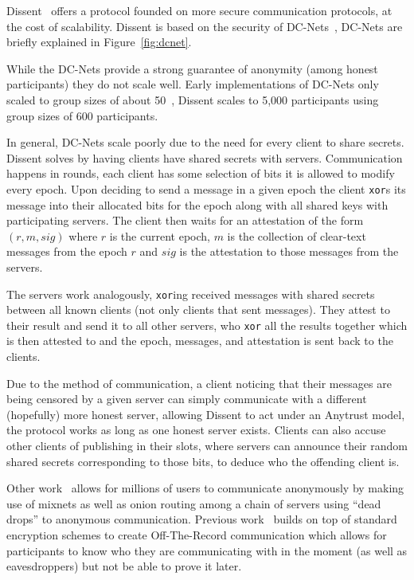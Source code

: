 \DCNet

Dissent~\cite{wolinsky2012dissent} offers a protocol founded on more secure
communication protocols, at the cost of scalability. Dissent is based on the
security of DC-Nets~\cite{chaum1988dining}, DC-Nets are briefly explained in
Figure~\ref{fig:dcnet}.

While the DC-Nets provide a strong guarantee of anonymity (among honest
participants) they do not scale well. Early implementations of DC-Nets only
scaled to group sizes of about 50~\cite{corrigan2010dissent, goel2003herbivore},
Dissent scales to 5,000 participants using group sizes of 600 participants.

In general, DC-Nets scale poorly due to the need for every client to share
secrets. Dissent solves by having clients have shared secrets with servers.
Communication happens in rounds, each client has some selection of bits it is
allowed to modify every epoch. Upon deciding to send a message in a given epoch
the client \texttt{xor}s its message into their allocated bits for the epoch
along with all shared keys with participating servers. The client then waits for
an attestation of the form $(r, m, sig)$ where $r$ is the current epoch, $m$ is
the collection of clear-text messages from the epoch $r$ and $sig$ is the
attestation to those messages from the servers.

The servers work analogously, \texttt{xor}ing received messages with shared
secrets between all known clients (not only clients that sent messages). They
attest to their result and send it to all other servers, who \texttt{xor} all
the results together which is then attested to and the epoch, messages, and
attestation is sent back to the clients.

Due to the method of communication, a client noticing that their messages are
being censored by a given server can simply communicate with a different
(hopefully) more honest server, allowing Dissent to act under an Anytrust model,
the protocol works as long as one honest server exists. Clients can also accuse
other clients of publishing in their slots, where servers can announce their
random shared secrets corresponding to those bits, to deduce who the offending
client is.

Other work~\cite{van2015vuvuzela} allows for millions of users to communicate
anonymously by making use of mixnets as well as onion routing among a chain of
servers using ``dead drops'' to anonymous communication. Previous
work~\cite{borisov2004off} builds on top of standard encryption schemes to
create Off-The-Record communication which allows for participants to know who
they are communicating with in the moment (as well as eavesdroppers) but not be
able to prove it later.
